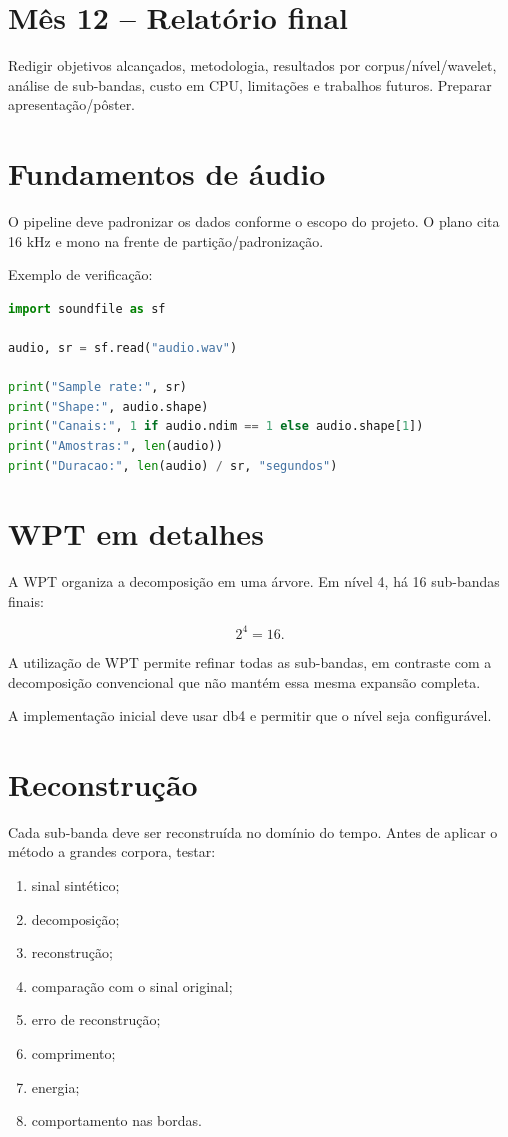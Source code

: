 \documentclass[12pt,a4paper]{article}
\begin{document}
\section{Mês 12 -- Relatório final}

Redigir objetivos alcançados, metodologia, resultados por corpus/nível/wavelet, análise de sub-bandas, custo em CPU, limitações e trabalhos futuros. Preparar apresentação/pôster.

\section{Fundamentos de áudio}

O pipeline deve padronizar os dados conforme o escopo do projeto. O plano cita 16 kHz e mono na frente de partição/padronização.

Exemplo de verificação:

\begin{lstlisting}[language=Python]
import soundfile as sf

audio, sr = sf.read("audio.wav")

print("Sample rate:", sr)
print("Shape:", audio.shape)
print("Canais:", 1 if audio.ndim == 1 else audio.shape[1])
print("Amostras:", len(audio))
print("Duracao:", len(audio) / sr, "segundos")
\end{lstlisting}

\section{WPT em detalhes}

A WPT organiza a decomposição em uma árvore. Em nível 4, há 16 sub-bandas finais:

\[
2^4=16.
\]

A utilização de WPT permite refinar todas as sub-bandas, em contraste com a decomposição convencional que não mantém essa mesma expansão completa.

A implementação inicial deve usar db4 e permitir que o nível seja configurável.

\section{Reconstrução}

Cada sub-banda deve ser reconstruída no domínio do tempo. Antes de aplicar o método a grandes corpora, testar:
\begin{enumerate}
\item sinal sintético;
\item decomposição;
\item reconstrução;
\item comparação com o sinal original;
\item erro de reconstrução;
\item comprimento;
\item energia;
\item comportamento nas bordas.
\end{enumerate}
\end{document}

